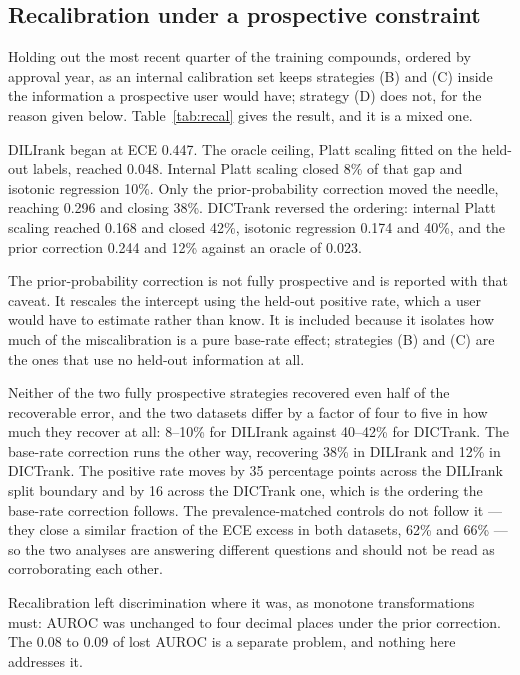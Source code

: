 \subsection{Recalibration under a prospective constraint}

Holding out the most recent quarter of the training compounds, ordered by approval
year, as an internal calibration set keeps strategies (B) and (C) inside the
information a prospective user would have; strategy (D) does not, for the reason
given below. Table~\ref{tab:recal} gives the result, and it is a mixed one.

DILIrank began at ECE 0.447. The oracle ceiling, Platt scaling fitted on the
held-out labels, reached 0.048. Internal Platt scaling closed 8\% of that gap and
isotonic regression 10\%. Only the prior-probability correction moved the needle,
reaching 0.296 and closing 38\%. DICTrank reversed the ordering: internal Platt
scaling reached 0.168 and closed 42\%, isotonic regression 0.174 and 40\%, and the
prior correction 0.244 and 12\% against an oracle of 0.023.

The prior-probability correction is not fully prospective and is reported with
that caveat. It rescales the intercept using the held-out positive rate, which a
user would have to estimate rather than know. It is included because it isolates
how much of the miscalibration is a pure base-rate effect; strategies (B) and (C)
are the ones that use no held-out information at all.

Neither of the two fully prospective strategies recovered even half of the
recoverable error, and the two datasets differ by a factor of four to five in how
much they recover at all: 8--10\% for DILIrank against 40--42\% for DICTrank. The
base-rate correction runs the other way, recovering 38\% in DILIrank and 12\% in
DICTrank. The positive rate moves by 35 percentage points across the DILIrank
split boundary and by 16 across the DICTrank one, which is the ordering the
base-rate correction follows. The prevalence-matched controls do not follow it ---
they close a similar fraction of the ECE excess in both datasets, 62\% and 66\% ---
so the two analyses are answering different questions and should not be read as
corroborating each other.

Recalibration left discrimination where it was, as monotone transformations must:
AUROC was unchanged to four decimal places under the prior correction. The 0.08 to
0.09 of lost AUROC is a separate problem, and nothing here addresses it.

